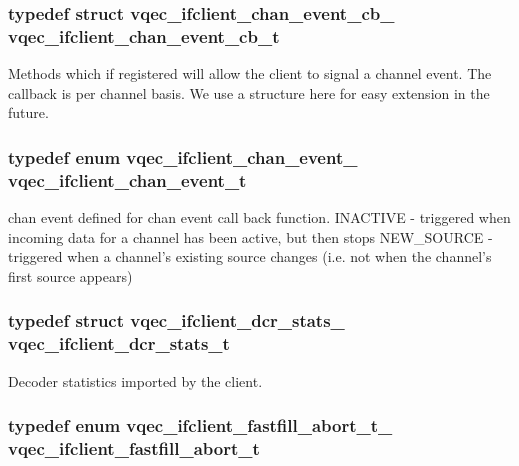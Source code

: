 \subsubsection{\setlength{\rightskip}{0pt plus 5cm}typedef struct \bf{vqec\_\-ifclient\_\-chan\_\-event\_\-cb\_\-}  \bf{vqec\_\-ifclient\_\-chan\_\-event\_\-cb\_\-t}}\label{group__structs_g30849ea6195a02679a41a921799043bd}


Methods which if registered will allow the client to signal a channel event. The callback is per channel basis. We use a structure here for easy extension in the future. 
\subsubsection{\setlength{\rightskip}{0pt plus 5cm}typedef enum \bf{vqec\_\-ifclient\_\-chan\_\-event\_\-}  \bf{vqec\_\-ifclient\_\-chan\_\-event\_\-t}}\label{group__structs_g91a75d6a36f5171177568febfcb72700}


chan event defined for chan event call back function. INACTIVE - triggered when incoming data for a channel has been active, but then stops NEW\_\-SOURCE - triggered when a channel's existing source changes (i.e. not when the channel's first source appears) 
\subsubsection{\setlength{\rightskip}{0pt plus 5cm}typedef struct \bf{vqec\_\-ifclient\_\-dcr\_\-stats\_\-}  \bf{vqec\_\-ifclient\_\-dcr\_\-stats\_\-t}}\label{group__structs_gc57f999831bbb072545fb34ae3726fd8}


Decoder statistics imported by the client. 
\subsubsection{\setlength{\rightskip}{0pt plus 5cm}typedef enum \bf{vqec\_\-ifclient\_\-fastfill\_\-abort\_\-t\_\-}  \bf{vqec\_\-ifclient\_\-fastfill\_\-abort\_\-t}}\label{group__structs_g5770ef1bff97a78fcec7b409bd1b3383}


